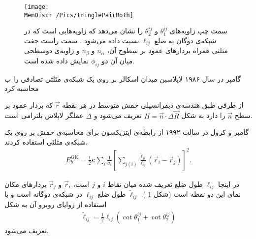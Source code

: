 \begin{figure}[h]
\begin{center}
\texttt{[image: \\MemDiscr /Pics/tringlePairBoth]}
\caption{
سمت چپ زاویه‌های 
$\theta_1^{ij}$
و
$\theta_2^{ij}$
را نشان می‌دهد که زاویه‌هایی است که در شبکه‌ی دوگان به ضلع
$\ell_{ij}$
نسبت داده می‌شود
\cite{Meyer2003}
. سمت راست جفت مثلثی همراه بردار‌های عمود بر سطوح آن،
$n_\alpha$
و
$n_\beta$
و زاویه‌ی دوسطحی میان آن دو
$\phi_{ij}$
نمایش داده شده ‌است.
}
\label{fig:trianglePairAngle}
\end{center}
\end{figure}

گامپر
در سال ۱۹۸۶ لاپلاسین میدان اسکالر بر روی یک شبکه‌ی مثلثی تصادفی را ب محاسبه کرد
\cite{Itzykson1986}

از طرفی طبق هندسه‌ی دیفرانسیلی  خمش متوسط در هر نقطه 
$\vec r$
که بردار عمود بر سطح 
$\vec n$
را دارد به شکل 
$H=\vec n\cdot\Delta \vec R$
تعریف می‌شود 
\cite{gompper1996}
و 
$\Delta$
عملگر لاپلاس بلترامی 
است. 


گامپر و کرول در سالت ۱۹۹۲ از رابطه‌ی ایتزیکسون برای محاسبه‌ی خمش بر روی یک شبکه‌ی مثلثی استفاده کردند،
\begin{eqnarray}
E_{b}^\text{GK}=\frac{1}{2}\kappa\sum_{i}\frac{1}{\sigma_i}\left[\sum_{j(i)}\frac{\tilde\ell_{ji}}{\ell_{ij}}(\vec r_i-\vec r_j)\right]^2.
\label{eq:ItzyksonPotential}
\end{eqnarray}

در اینجا 
$\ell_{ij}$
طول ضلع تعریف شده میان نقاط 
$i$
و
$j$
است، 
$\vec r_i$
و
$\vec r_j$
بردار‌های مکان نمای این دو نقطه‌ است (شکل
\ref{fig:trianglePairAngle}
). 
$\tilde\ell_{ij}$
طول ضلع 
$\ell_{ij}$
در شبکه‌ی دوگانه‌ 
است و با استفاده از زوایا‌ی روبرو آن به شکل 
\begin{eqnarray}
\tilde\ell_{ij}=\frac{1}{2}\ell_{ij}(\cot\theta_1^{ij}+\cot\theta_2^{ij})
\label{eq:dualLattice}
\end{eqnarray}
تعریف می‌شود.

